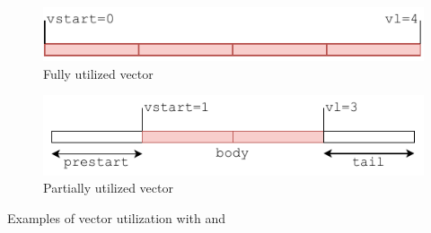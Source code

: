 \figcheckinputs{}
\begin{turnipfig}
    \centering
    \begin{subfigure}[b]{\figinputWidth}
        \centering
        \includegraphics[width=\textwidth]{Figures/RVV_VL_full.pdf}
        \caption{Fully utilized vector}
        \label{fig:RVV_vl_full}
    \end{subfigure}
    \hfill
    \begin{subfigure}[b]{\figinputWidth}
        \centering
        \includegraphics[width=\textwidth]{Figures/RVV_VL_short.pdf}
        \caption{Partially utilized vector}
        \label{fig:RVV_vl_short}
    \end{subfigure}
    \caption{Examples of vector utilization with  and }
    \label{fig:RVV_vl}
\end{turnipfig}